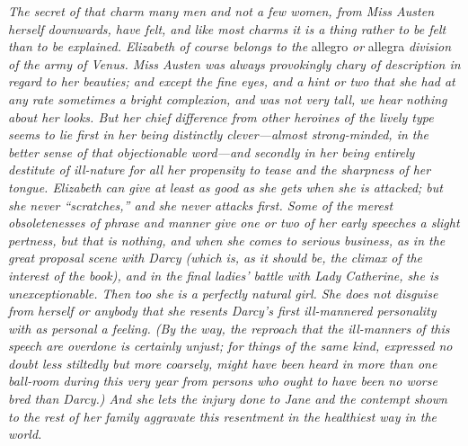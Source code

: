 \textit{The secret of that charm many men and not a few women, from Miss Austen herself downwards, have felt, and like most charms it is a thing rather to be felt than to be explained. Elizabeth of course belongs to the} allegro \textit{or} allegra \textit{division of the army of Venus. Miss Austen was always provokingly chary of description in regard to her beauties; and except the fine eyes, and a hint or two that she had at any rate sometimes a bright complexion, and was not very tall, we hear nothing about her looks. But her chief difference from other heroines of the lively type seems to lie first in her being distinctly clever---almost strong-minded, in the better sense of that objectionable word---and secondly in her being entirely destitute of ill-nature for all her propensity to tease and the sharpness of her tongue. Elizabeth can give at least as good as she gets when she is attacked; but she never ``scratches,'' and she never attacks first. Some of the merest obsoletenesses of phrase and manner give one or two of her early speeches a slight pertness, but that is nothing, and when she comes to serious business, as in the great proposal scene with Darcy (which is, as it should be, the climax of the interest of the book), and in the final ladies' battle with Lady Catherine, she is unexceptionable. Then too she is a perfectly natural girl. She does not disguise from herself or anybody that she resents Darcy's first ill-mannered personality with as personal a feeling. (By the way, the reproach that the ill-manners of this speech are overdone is certainly unjust; for things of the same kind, expressed no doubt less stiltedly but more coarsely, might have been heard in more than one ball-room during this very year from persons who ought to have been no worse bred than Darcy.) And she lets the injury done to Jane and the contempt shown to the rest of her family aggravate this resentment in the healthiest way in the world.}

